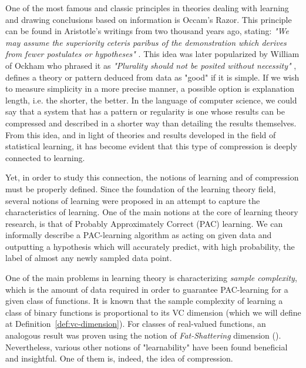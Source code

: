 \documentclass[12pt,a4paper,oneside,onecolumn]{book}
\begin{document}
One of the most famous and classic principles in theories dealing with learning and drawing conclusions based on information is Occam's Razor. 
This principle can be found in Aristotle's writings from two thousand years ago, stating:
\emph{"We may assume the superiority ceteris paribus of the demonstration which derives from fewer postulates or hypotheses"}  \citep{10.2307/j.ctv1228h9n.7}.
This idea was later popularized by 
William of Ockham who phrased it as \emph{"Plurality should not be posited without necessity"} \citep{duignan_1998},
defines a theory or pattern deduced from data as "good" if it is simple. 
%
%
If we wish to measure simplicity in a more precise manner, a possible option is explanation length, i.e. the shorter, the better.  
In the language of computer science, we could say that a system that has a pattern or regularity is one whose results can be compressed and described in a shorter way than detailing the results themselves.
From this idea, and in light of theories and results developed in the field of statistical learning, it has become evident that this type of compression is deeply connected to learning.

%
%
%
%

%
%

Yet, in order to study this connection, the notions of learning and of compression must be properly defined.
Since the foundation of the learning theory field, several notions of learning were proposed in an attempt to capture the characteristics of learning.
One of the main notions at the core of learning theory research, is that of Probably Approximately Correct (PAC) learning. 
We can informally describe a PAC-learning algorithm as acting on given data and outputting a hypothesis which will accurately predict, with high probability, the label of almost any newly sampled data point. 

One of the main problems in learning theory is characterizing \emph{sample complexity}, which is the amount of data required in order to guarantee PAC-learning for a given class of functions.
It is known that the sample complexity of learning a class of binary functions is proportional to its VC dimension (which we will define at Definition~\ref{def:vc-dimension}). 
For classes of real-valued functions, an analogous result was proven using the notion of \emph{Fat-Shattering} dimension (\citet{alon97scalesensitive}).
Nevertheless, various other notions of "learnability" have been found beneficial and insightful. One of them is, indeed, the idea of compression.
\end{document}
